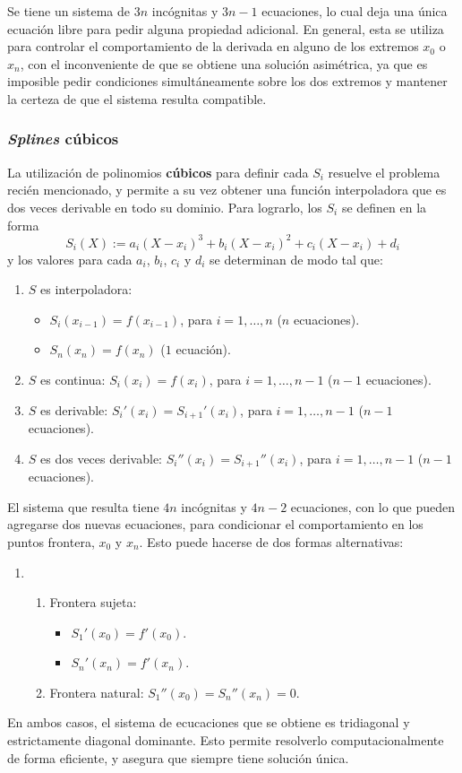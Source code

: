Se tiene un sistema de $3n$ incógnitas y $3n-1$ ecuaciones, lo cual deja una
única ecuación libre para pedir alguna propiedad adicional. En general, esta
se utiliza para controlar el comportamiento de la derivada en alguno de los
extremos $x_0$ o $x_n$, con el inconveniente de que se obtiene una solución
asimétrica, ya que es imposible pedir condiciones simultáneamente sobre los
dos extremos y mantener la certeza de que el sistema resulta compatible.

\subsubsection{\emph{Splines} cúbicos}
La utilización de polinomios \textbf{cúbicos} para definir cada $S_i$ resuelve
el problema recién mencionado, y permite a su vez obtener una función
interpoladora que es dos veces derivable en todo su dominio. Para lograrlo,
los $S_i$ se definen en la forma
\[ S_i(X) := a_i (X - x_i)^3 + b_i (X - x_i)^2 + c_i (X - x_i) + d_i \]
y los valores para cada $a_i$, $b_i$, $c_i$ y $d_i$ se determinan de modo tal
que:

\begin{enumerate}[label=(\roman*)]
\item $S$ es interpoladora:
    \begin{itemize}
    \item $S_i(x_{i-1}) = f(x_{i-1})$, para $i = 1, \dots, n$ ($n$ ecuaciones).
    \item $S_n(x_n) = f(x_n)$ ($1$ ecuación).
    \end{itemize}
\item $S$ es continua:
    $S_i(x_i) = f(x_i)$, para $i = 1, \dots, n-1$ ($n-1$ ecuaciones).
\item $S$ es derivable:
    $S_i'(x_i) = S_{i+1}'(x_i)$, para $i = 1, \dots, n-1$ ($n-1$ ecuaciones).
\item $S$ es dos veces derivable:
    $S_i''(x_i) = S_{i+1}''(x_i)$, para $i = 1, \dots, n-1$ ($n-1$ ecuaciones).
\end{enumerate}

El sistema que resulta tiene $4n$ incógnitas y $4n - 2$ ecuaciones, con lo que
pueden agregarse dos nuevas ecuaciones, para condicionar el comportamiento en
los puntos frontera, $x_0$ y $x_n$. Esto puede hacerse de dos formas
alternativas:

\begin{enumerate}[label=(\roman*), resume]
\item \begin{enumerate}[label=(\alph*)]
    \item Frontera sujeta: \begin{itemize}
        \item $S_1'(x_0) = f'(x_0)$.
        \item $S_n'(x_n) = f'(x_n)$.
        \end{itemize}
    \item Frontera natural: $S_1''(x_0) = S_n''(x_n) = 0$.
\end{enumerate}
\end{enumerate}

En ambos casos, el sistema de ecucaciones que se obtiene es tridiagonal y
estrictamente diagonal dominante. Esto permite resolverlo computacionalmente
de forma eficiente, y asegura que siempre tiene solución única.
